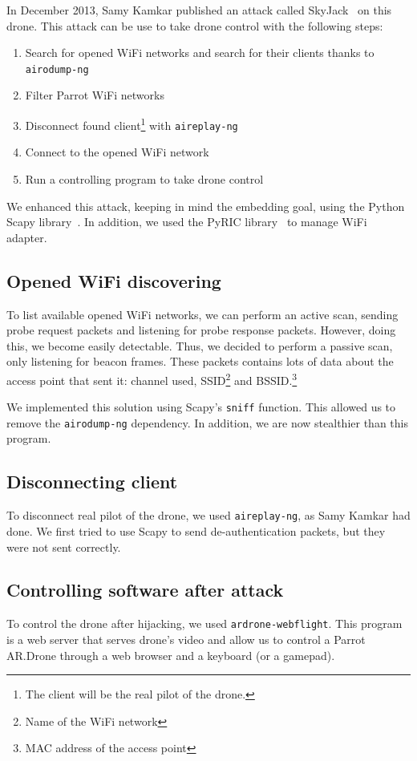 \documentclass[conference,a4paper]{IEEEtran}
\newcommand{\myv}[1]{\texttt{\small#1}}
\begin{document}
In December 2013, Samy Kamkar published an attack called SkyJack~\cite{bib:skyjack} on
this drone. This attack can be use to take drone control with the following steps:

\begin{enumerate}
  \item Search for opened WiFi networks and search for their clients thanks to
    \myv{airodump-ng}
  \item Filter Parrot WiFi networks
  \item Disconnect found client\footnote{The client will be the real pilot of the drone.}
    with \myv{aireplay-ng}
  \item Connect to the opened WiFi network
  \item Run a controlling program to take drone control
\end{enumerate}

We enhanced this attack, keeping in mind the embedding goal, using the Python Scapy
library~\cite{bib:scapy}. In addition, we used the PyRIC library~\cite{bib:pyric} to
manage WiFi adapter.

\subsection{Opened WiFi discovering}
To list available opened WiFi networks, we can perform an active scan, sending probe
request packets and listening for probe response packets. However, doing this, we become
easily detectable. Thus, we decided to perform a passive scan, only listening for beacon
frames. These packets contains lots of data about the access point that sent it: channel
used, SSID\footnote{Name of the WiFi network} and BSSID.\footnote{MAC address of the access
point}

We implemented this solution using Scapy's \myv{sniff} function. This allowed us to
remove the \myv{airodump-ng} dependency. In addition, we are now stealthier than this
program.

\subsection{Disconnecting client}
To disconnect real pilot of the drone, we used \myv{aireplay-ng}, as Samy Kamkar had
done. We first tried to use Scapy to send de-authentication packets, but they were not sent
correctly.

\subsection{Controlling software after attack}
To control the drone after hijacking, we used \myv{ardrone-webflight}. This program is
a web server that serves drone's video and allow us to control a Parrot AR.Drone through a
web browser and a keyboard (or a gamepad).
\end{document}
